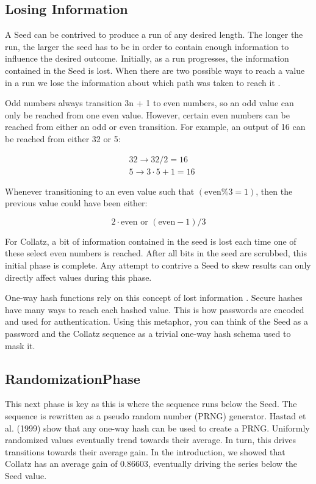 \documentclass[preprint]{sigplanconf}
\begin{document}
\subsection{Losing Information}
A Seed can be contrived to produce a run of any desired length. The longer the run, the larger the seed has to be in order to contain enough information to influence the desired outcome. Initially, as a run progresses, the information contained in the Seed is lost. When there are two possible ways to reach a value in a run we lose the information about which path was taken to reach it \cite{2}.

Odd numbers always transition 3n + 1 to even numbers, so an odd value can only be reached from one even value. However, certain even numbers can be reached from either an odd or even transition. For example, an output of 16 can be reached from either 32 or 5:

\[
    \begin{aligned}
         & 32 \rightarrow 32 / 2 = 16     \\
         & 5 \rightarrow 3\cdot5 + 1 = 16
    \end{aligned}
\]

Whenever transitioning to an even value such that $(\text{even} \% 3 = 1)$, then the previous value could have been either:

\[
    2 \cdot \text{even or } (\text{even} - 1) / 3
\]

For Collatz, a bit of information contained in the seed is lost each time one of these select even numbers is reached. After all bits in the seed are scrubbed, this initial phase is complete. Any attempt to contrive a Seed to skew results can only directly affect values during this phase.

One-way hash functions rely on this concept of lost information \cite{3}. Secure hashes have many ways to reach each hashed value. This is how passwords are encoded and used for authentication. Using this metaphor, you can think of the Seed as a password and the Collatz sequence as a trivial one-way hash schema used to mask it.

\subsection{RandomizationPhase}

This next phase is key as this is where the sequence runs below the Seed. The sequence is rewritten as a pseudo random number (PRNG) generator. Hastad et al. (1999) \cite{4} show that any one-way hash can be used to create a PRNG. Uniformly randomized values eventually trend towards their average. In turn, this drives transitions towards their average gain. In the introduction, we showed that Collatz has an average gain of $0.86603$, eventually driving the series below the Seed value.
\end{document}
